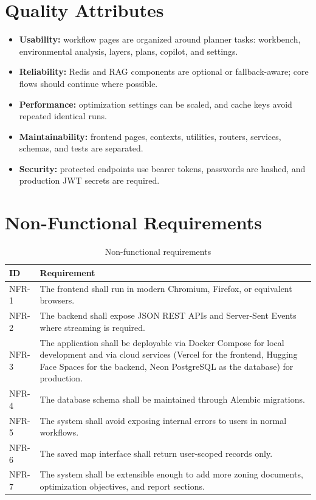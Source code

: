 \documentclass[12pt,a4paper,oneside]{report}
\begin{document}
\section{Quality Attributes}
\begin{itemize}
  \item \textbf{Usability:} workflow pages are organized around planner tasks: workbench, environmental analysis, layers, plans, copilot, and settings.
  \item \textbf{Reliability:} Redis and RAG components are optional or fallback-aware; core flows should continue where possible.
  \item \textbf{Performance:} optimization settings can be scaled, and cache keys avoid repeated identical runs.
  \item \textbf{Maintainability:} frontend pages, contexts, utilities, routers, services, schemas, and tests are separated.
  \item \textbf{Security:} protected endpoints use bearer tokens, passwords are hashed, and production JWT secrets are required.
\end{itemize}

\section{Non-Functional Requirements}
\begin{longtable}{p{}p{}}
\caption{Non-functional requirements}\label{tab:nfr}\\
\toprule
ID & Requirement \\
\midrule
NFR-1 & The frontend shall run in modern Chromium, Firefox, or equivalent browsers. \\
NFR-2 & The backend shall expose JSON REST APIs and Server-Sent Events where streaming is required. \\
NFR-3 & The application shall be deployable via Docker Compose for local development and via cloud services (Vercel for the frontend, Hugging Face Spaces for the backend, Neon PostgreSQL as the database) for production. \\
NFR-4 & The database schema shall be maintained through Alembic migrations. \\
NFR-5 & The system shall avoid exposing internal errors to users in normal workflows. \\
NFR-6 & The saved map interface shall return user-scoped records only. \\
NFR-7 & The system shall be extensible enough to add more zoning documents, optimization objectives, and report sections. \\
\bottomrule
\end{longtable}
\end{document}
